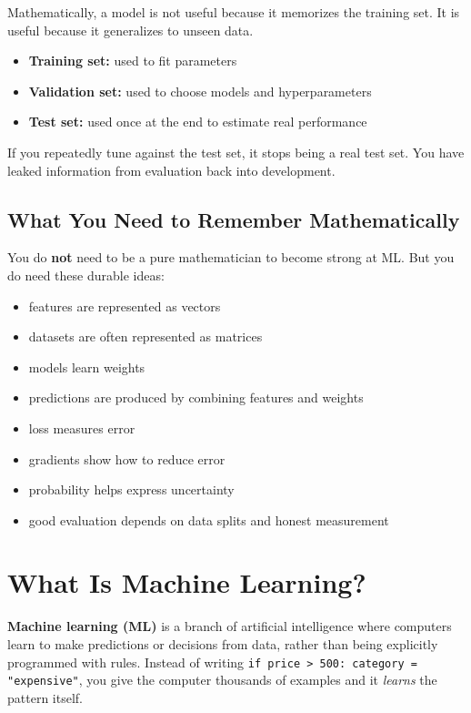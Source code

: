 \documentclass[12pt, a4paper, oneside]{book}
\begin{document}
Mathematically, a model is not useful because it memorizes the training set. It is useful because it generalizes to unseen data.

\begin{itemize}[leftmargin=2em]
    \item \textbf{Training set:} used to fit parameters
    \item \textbf{Validation set:} used to choose models and hyperparameters
    \item \textbf{Test set:} used once at the end to estimate real performance
\end{itemize}

\begin{warningbox}
If you repeatedly tune against the test set, it stops being a real test set. You have leaked information from evaluation back into development.
\end{warningbox}

\subsection{What You Need to Remember Mathematically}

You do \textbf{not} need to be a pure mathematician to become strong at ML. But you do need these durable ideas:

\begin{itemize}[leftmargin=2em]
    \item features are represented as vectors
    \item datasets are often represented as matrices
    \item models learn weights
    \item predictions are produced by combining features and weights
    \item loss measures error
    \item gradients show how to reduce error
    \item probability helps express uncertainty
    \item good evaluation depends on data splits and honest measurement
\end{itemize}

\section{What Is Machine Learning?}

\textbf{Machine learning (ML)} is a branch of artificial intelligence where computers learn to make predictions or decisions from data, rather than being explicitly programmed with rules. Instead of writing \texttt{if price > 500: category = "expensive"}, you give the computer thousands of examples and it \emph{learns} the pattern itself.
\end{document}
